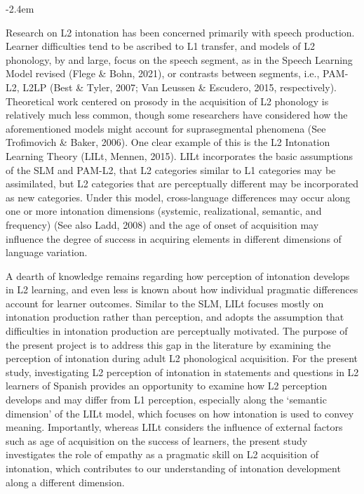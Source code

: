 \documentclass[]{article}
\renewenvironment{quote}{\begin{fquote}\advance\leftmargini -2.4em\begin{oldquote}}{\end{oldquote}\end{fquote}}
\newenvironment{fquote}
  {\def\FrameCommand{
	\fboxsep=0.6em %
	\fcolorbox{black}{white}}%
    \MakeFramed {\advance\hsize-2\width \FrameRestore}
    \begin{minipage}{\linewidth}
  }
  {\end{minipage}\endMakeFramed}
\begin{document}
\begin{quote}
Research on L2 intonation has been concerned primarily with speech production.
Learner difficulties tend to be ascribed to L1 transfer, and models of L2 phonology, by and large, focus on the speech segment, as in the Speech Learning Model revised (Flege \& Bohn, 2021), or contrasts between segments, i.e., PAM-L2, L2LP (Best \& Tyler, 2007; Van Leussen \& Escudero, 2015, respectively).
Theoretical work centered on prosody in the acquisition of L2 phonology is relatively much less common, though some researchers have considered how the aforementioned models might account for suprasegmental phenomena (See Trofimovich \& Baker, 2006).
One clear example of this is the L2 Intonation Learning Theory (LILt, Mennen, 2015).
LILt incorporates the basic assumptions of the SLM and PAM-L2, that L2 categories similar to L1 categories may be assimilated, but L2 categories that are perceptually different may be incorporated as new categories.
Under this model, cross-language differences may occur along one or more intonation dimensions (systemic, realizational, semantic, and frequency) (See also Ladd, 2008) and the age of onset of acquisition may influence the degree of success in acquiring elements in different dimensions of language variation.

A dearth of knowledge remains regarding how perception of intonation develops in L2 learning, and even less is known about how individual pragmatic differences account for learner outcomes.
Similar to the SLM, LILt focuses mostly on intonation production rather than perception, and adopts the assumption that difficulties in intonation production are perceptually motivated.
The purpose of the present project is to address this gap in the literature by examining the perception of intonation during adult L2 phonological acquisition.
For the present study, investigating L2 perception of intonation in statements and questions in L2 learners of Spanish provides an opportunity to examine how L2 perception develops and may differ from L1 perception, especially along the `semantic dimension' of the LILt model, which focuses on how intonation is used to convey meaning.
Importantly, whereas LILt considers the influence of external factors such as age of acquisition on the success of learners, the present study investigates the role of empathy as a pragmatic skill on L2 acquisition of intonation, which contributes to our understanding of intonation development along a different dimension.
\end{quote}
\end{document}

